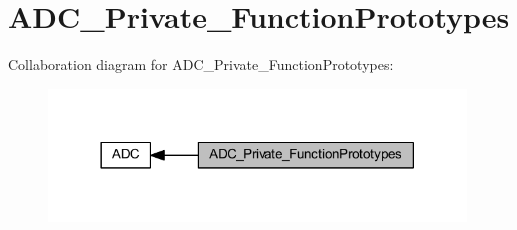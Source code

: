 \hypertarget{group___a_d_c___private___function_prototypes}{}\section{A\+D\+C\+\_\+\+Private\+\_\+\+Function\+Prototypes}
\label{group___a_d_c___private___function_prototypes}
Collaboration diagram for A\+D\+C\+\_\+\+Private\+\_\+\+Function\+Prototypes\+:
\nopagebreak
\begin{figure}[H]
\begin{center}
\leavevmode
\includegraphics[width=314pt]{group___a_d_c___private___function_prototypes}
\end{center}
\end{figure}
